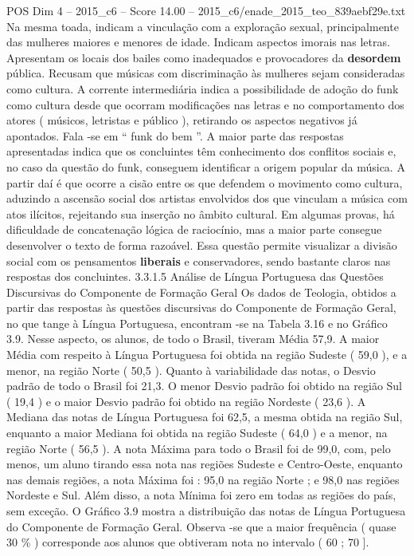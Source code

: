 \begin{textsample}{POS Dim 4 – 2015\_c6 – Score 14.00 – 2015\_c6/enade\_2015\_teo\_839aebf29e.txt}
Na mesma toada, indicam a vinculação com a exploração sexual, principalmente das mulheres maiores e menores de idade.
Indicam aspectos imorais nas letras.
Apresentam os locais dos bailes como inadequados e provocadores da \textbf{desordem} pública.
Recusam que músicas com discriminação às mulheres sejam consideradas como cultura.
A corrente intermediária indica a possibilidade de adoção do funk como cultura desde que ocorram modificações nas letras e no comportamento dos atores ( músicos, letristas e público ), retirando os aspectos negativos já apontados.
Fala -se em “ funk do bem ”.
A maior parte das respostas apresentadas indica que os concluintes têm conhecimento dos conflitos sociais e, no caso da questão do funk, conseguem identificar a origem popular da música.
A partir daí é que ocorre a cisão entre os que defendem o movimento como cultura, aduzindo a ascensão social dos artistas envolvidos dos que vinculam a música com atos ilícitos, rejeitando sua inserção no âmbito cultural.
Em algumas provas, há dificuldade de concatenação lógica de raciocínio, mas a maior parte consegue desenvolver o texto de forma razoável.
Essa questão permite visualizar a divisão social com os pensamentos \textbf{liberais} e conservadores, sendo bastante claros nas respostas dos concluintes. 3.3.1.5 Análise de Língua Portuguesa das Questões Discursivas do Componente de Formação Geral Os dados de Teologia, obtidos a partir das respostas às questões discursivas do Componente de Formação Geral, no que tange à Língua Portuguesa, encontram -se na Tabela 3.16 e no Gráfico 3.9.
Nesse aspecto, os alunos, de todo o Brasil, tiveram Média 57,9.
A maior Média com respeito à Língua Portuguesa foi obtida na região Sudeste ( 59,0 ), e a menor, na região Norte ( 50,5 ).
Quanto à variabilidade das notas, o Desvio padrão de todo o Brasil foi 21,3.
O menor Desvio padrão foi obtido na região Sul ( 19,4 ) e o maior Desvio padrão foi obtido na região Nordeste ( 23,6 ).
A Mediana das notas de Língua Portuguesa foi 62,5, a mesma obtida na região Sul, enquanto a maior Mediana foi obtida na região Sudeste ( 64,0 ) e a menor, na região Norte ( 56,5 ).
A nota Máxima para todo o Brasil foi de 99,0, com, pelo menos, um aluno tirando essa nota nas regiões Sudeste e Centro-Oeste, enquanto nas demais regiões, a nota Máxima foi : 95,0 na região Norte ; e 98,0 nas regiões Nordeste e Sul.
Além disso, a nota Mínima foi zero em todas as regiões do país, sem exceção.
O Gráfico 3.9 mostra a distribuição das notas de Língua Portuguesa do Componente de Formação Geral.
Observa -se que a maior frequência ( quase 30 \% ) corresponde aos alunos que obtiveram nota no intervalo ( 60 ; 70 ].

\end{textsample}
